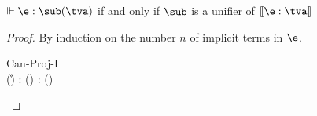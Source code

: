 \documentclass[acmsmall,screen,nonacm,review]{acmart}
\begin{document}
\begin{theorem}
  \label{thm:soundness-and-completeness}
  $\Th \e : \sub(\tv)$ if and only if $\sub$ is a unifier of $\csem {\e : \tv}$
  \begin{proof}
    By induction on the number $n$ of implicit terms in $\e$.
    \begin{proofcases}

	\begin{llproof}
\Hand	  {}
	\end{llproof}


	\begin{proofcases}
	  \proofcase{$\implies$}

	  \begin{proofcases}

	    \proofcasederivation
	      {Can-Proj-I}
	      {\eshape \E \e {\any \tvcs \Pi\iton \tvcs} \\ \sub(\G) \Th \E{} : \sub(\tv)}
	      {\Th \E{} : \sub(\tv)}


\end{proofcases}
\end{proofcases}
\end{proofcases}
\end{proof}
\end{theorem}
\end{document}
